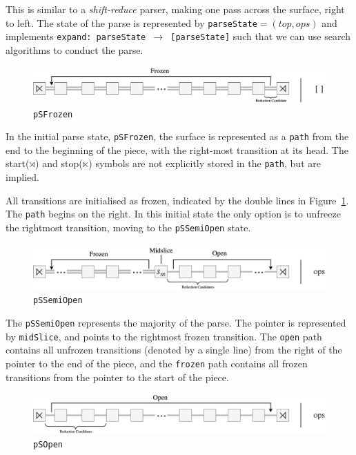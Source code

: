 \documentclass[12pt,a4paper,twoside,openany]{report} \usepackage[pdfborder={0 0 0}]{hyperref}    %
\theoremstyle{definition} \newtheorem{definition}{Definition}[section]
\begin{document}
      This is similar to a \textit{shift-reduce} parser, making one pass across the surface, right to left. The state of
      the parse is represented by \texttt{parseState}$= (top, ops)$ and implements \texttt{expand: parseState $\to$
      [parseState]} such that we can use search algorithms to conduct the parse.

      \begin{figure}[ht] \centering\includegraphics[width=\textwidth]{impl/parseState/frozen.png}
      \caption{\texttt{pSFrozen}} \label{fig:pSFrozen} \end{figure}

      In the initial parse state, \texttt{pSFrozen}, the surface is represented as a \texttt{path} from the end to the
      beginning of the piece, with the right-most transition at its head. The start($\rtimes$) and stop($\ltimes$)
      symbols are not explicitly stored in the \texttt{path}, but are implied.

      All transitions are initialised as frozen, indicated by the double lines in Figure~\ref{fig:pSFrozen}. The
      \texttt{path} begins on the right. In this initial state the only option is to unfreeze the rightmost transition,
      moving to the \texttt{pSSemiOpen} state. 

      \begin{figure}[ht] \centering\includegraphics[width=\textwidth]{impl/parseState/semiopen.png}
      \caption{\texttt{pSSemiOpen}} \label{fig:pSSemiOpen} \end{figure}

      The \texttt{pSSemiOpen} represents the majority of the parse. The pointer is represented by \texttt{midSlice}, and
      points to the rightmost frozen transition. The \texttt{open} path contains all unfrozen transitions (denoted by
      a single line) from the right of the pointer to the end of the piece, and the \texttt{frozen} path contains all
      frozen transitions from the pointer to the start of the piece.

      \begin{figure}[ht] \centering\includegraphics[width=\textwidth]{impl/parseState/open.png} \caption{\texttt{pSOpen}}
      \label{fig:pSOpen} \end{figure}
\end{document}
